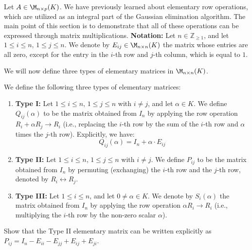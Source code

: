 Let $A \in \M_{n \times p}(K)$. We have previously learned about elementary row operations, which are utilized as an integral part of the Gaussian elimination algorithm. The main point of this section is to demonstrate that all of these operations can be expressed through matrix multiplications.
\textbf{Notation:} Let $n \in \mathbb{Z}_{\ge 1}$, and let $1 \le i \le n$, $1 \le j \le n$. We denote by $E_{ij} \in \M_{n \times n}(K)$ the matrix whose entries are all zero, except for the entry in the $i$-th row and $j$-th column, which is equal to $1$. 

We will now define three types of elementary matrices in $\M_{n \times n}(K)$.

\begin{definition}
\label{def:elementary_matrices}
We define the following three types of elementary matrices:
\begin{enumerate}
    \item \textbf{Type I:} Let $1 \le i \le n$, $1 \le j \le n$ with $i \neq j$, and let $\alpha \in K$. We define $Q_{ij}(\alpha)$ to be the matrix obtained from $I_n$ by applying the row operation $R_i + \alpha R_j \longrightarrow R_i$ (i.e., replacing the $i$-th row by the sum of the $i$-th row and $\alpha$ times the $j$-th row). Explicitly, we have:
    \begin{equation*}
        Q_{ij}(\alpha) = I_n + \alpha \cdot E_{ij}
    \end{equation*}
    
    \item \textbf{Type II:} Let $1 \le i \le n$, $1 \le j \le n$ with $i \neq j$. We define $P_{ij}$ to be the matrix obtained from $I_n$ by permuting (exchanging) the $i$-th row and the $j$-th row, denoted by $R_i \leftrightarrow R_j$.
    
    \item \textbf{Type III:} Let $1 \le i \le n$, and let $0 \neq \alpha \in K$. We denote by $S_i(\alpha)$ the matrix obtained from $I_n$ by applying the row operation $\alpha R_i \longrightarrow R_i$ (i.e., multiplying the $i$-th row by the non-zero scalar $\alpha$).
\end{enumerate}
\end{definition}

\begin{exercise}
Show that the Type II elementary matrix can be written explicitly as $P_{ij} = I_n - E_{ii} - E_{jj} + E_{ij} + E_{ji}$.
\end{exercise}


